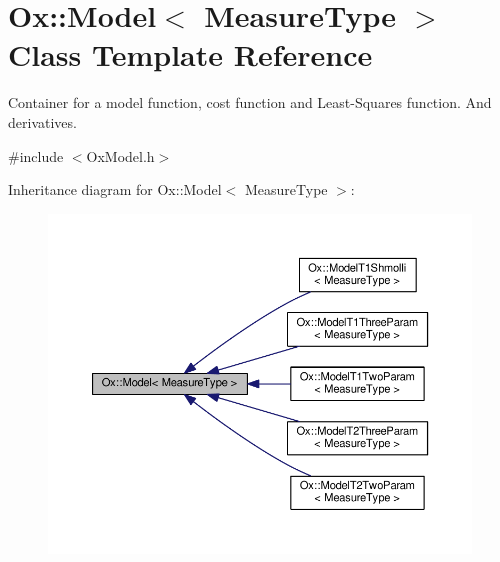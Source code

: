 \hypertarget{class_ox_1_1_model}{\section{Ox\-:\-:Model$<$ Measure\-Type $>$ Class Template Reference}
\label{class_ox_1_1_model}
}


Container for a model function, cost function and Least-\/\-Squares function. And derivatives.  




{\ttfamily \#include $<$Ox\-Model.\-h$>$}



Inheritance diagram for Ox\-:\-:Model$<$ Measure\-Type $>$\-:
\nopagebreak
\begin{figure}[H]
\begin{center}
\leavevmode
\includegraphics[width=350pt]{class_ox_1_1_model__inherit__graph}
\end{center}
\end{figure}
